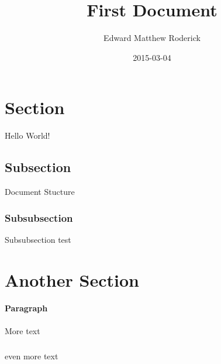 \documentclass{article}
\title{First Document}
\date{2015-03-04}
\author{Edward Matthew Roderick}
\begin{document}
 \maketitle
 \newpage

 \section{Section}
 
 Hello World!

 \subsection{Subsection}
 
 Document Stucture

 \subsubsection{Subsubsection}

 Subsubsection test

 \section{Another Section}
 \paragraph{Paragraph}

 More text

 \subparagraph{}

 even more text
\end{document}
